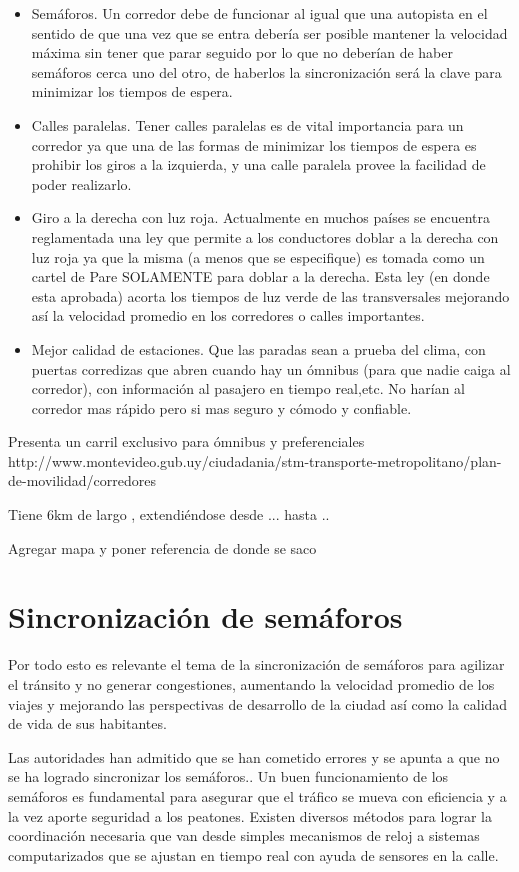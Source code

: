 \begin{itemize}
	\item Semáforos. Un corredor debe de funcionar al igual que una autopista en el sentido de que una vez que se entra debería ser posible mantener la velocidad máxima sin tener que parar seguido por lo que no deberían de haber semáforos cerca uno del otro, de haberlos la sincronización será la clave para minimizar los tiempos de espera.
	\item Calles paralelas. Tener calles paralelas es de vital importancia para un corredor ya que una de las formas de minimizar los tiempos de espera es prohibir los giros a la izquierda, y una calle paralela provee la facilidad de poder realizarlo.
	\item Giro a la derecha con luz roja. Actualmente en muchos países se encuentra reglamentada una ley que permite a los conductores doblar a la derecha con luz roja ya que la misma (a menos que se especifique) es tomada como un cartel de Pare SOLAMENTE para doblar a la derecha. Esta ley (en donde esta aprobada) acorta los tiempos de luz verde de las transversales mejorando así la velocidad promedio en los corredores o calles importantes.
	\item Mejor calidad de estaciones. Que las paradas sean a prueba del clima, con puertas corredizas que abren cuando hay un ómnibus (para que nadie caiga al corredor), con información al pasajero en tiempo real,etc. No harían al corredor mas rápido pero si mas seguro y cómodo y confiable.
\end{itemize}
Presenta un carril exclusivo para ómnibus y preferenciales
http://www.montevideo.gub.uy/ciudadania/stm-transporte-metropolitano/plan-de-movilidad/corredores

Tiene 6km de largo , extendiéndose desde ...  hasta ..

Agregar mapa y poner referencia de donde se saco



\section{Sincronización de semáforos}
Por todo esto es relevante el tema de la sincronización de semáforos para agilizar el tránsito y no generar congestiones, aumentando la velocidad promedio de los viajes y mejorando las perspectivas de desarrollo de la ciudad así como la calidad de vida de sus habitantes.

Las autoridades han admitido que se han cometido errores y se apunta a que no se ha logrado sincronizar los semáforos.\citep{olivera2013}. Un buen funcionamiento de los semáforos es fundamental para asegurar que el tráfico se mueva con eficiencia y a la vez aporte seguridad a los peatones. 
Existen diversos métodos para lograr la coordinación necesaria que van desde simples mecanismos de reloj a sistemas computarizados que se ajustan en tiempo real con ayuda de sensores en la calle.

